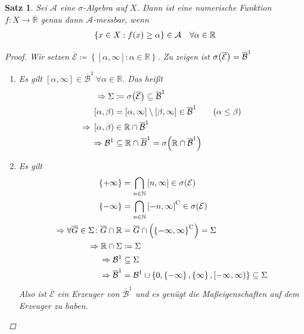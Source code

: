 \documentclass[11pt, twoside, a4paper]{article}
\theoremstyle{plain}
\newtheorem{satz}[blockelement]{Satz}
\numberwithin{equation}{subsection}
\newcommand{\set}[1]{\left\{#1\right\}}
\newcommand{\pair}[1]{\left(#1\right)}
\newcommand{\of}[1]{\mathopen{}\mathclose{}\bgroup\left(#1\aftergroup\egroup\right)}
\newcommand{\linterv}[1]{\left[#1\right)}
\newcommand{\interv}[1]{\left[#1\right]}
\newcommand{\impl}[0]{\Rightarrow{}}
\newcommand{\comp}[1]{{#1}^{\mathrm{C}}}
\newcommand{\R}{\mathbb{R}}
\newcommand{\N}{\mathbb{N}}
\newcommand{\mA}{\mathcal{A}}
\newcommand{\mB}{\mathcal{B}}
\newcommand{\mE}{\mathcal{E}}
\begin{document}
    \begin{satz}
        \label{satz:messbarkeit}
        Sei $\mA$ eine $\sigma$-Algebra auf $X$. Dann ist eine numerische Funktion $f: X\to\overline{\R}$ genau dann $\mA$-messbar, wenn
        \begin{align*}
            \set{x\in X: f\of{x} \geq \alpha} \in\mA\quad\forall \alpha\in\R
        \end{align*}
        \begin{proof}
            Wir setzen $\overline{\mE} \coloneqq \set{\interv{\alpha, \infty}: \alpha\in\R}$. Zu zeigen ist $\sigma\of{\overline{\mE}} = \overline{\mB}^1$
            \begin{enumerate}[label=(\arabic*)]
                \item Es gilt $\interv{\alpha, \infty} \in \overline{\mB}^1~\forall\alpha\in\R$. Das heißt
                \begin{align*}
                    \impl\Sigma &\coloneqq \sigma\of{\overline{\mE}} \subseteq \overline{\mB}^1\\
                    \linterv{\alpha, \beta} &= \interv{\alpha, \infty} \setminus \interv{\beta, \infty} \in\overline{\mB}^1\tag{$\alpha \leq \beta$}\\
                    \impl \linterv{\alpha, \beta} &\in \R\cap\overline{\mB}^1\\
                    \impl \mB^1 &\subseteq \R \cap \overline{B}^1 = \sigma\of{\R \cap \overline{\mB}^1}
                \end{align*}
                \item Es gilt
                \begin{align*}
                    \set{+\infty} &= \bigcap_{n\in\N} \interv{n, \infty} \in \sigma\of{\mE}\\
                    \set{-\infty} &= \bigcap_{n\in\N} \comp{\interv{-n, \infty}} \in \sigma\of{\mE}\\
                    \impl \forall \overline{G}\in\Sigma\colon \overline{G} \cap \R &= \overline{G} \cap \pair{\comp{\set{-\infty,\infty}}} = \Sigma\\
                    \impl \R \cap \Sigma &\coloneqq \Sigma\\
                    \impl \mB^1 &\subseteq \Sigma\\
                    \impl \overline{\mB}^1 &= \mB^1 \cup \set{0, \set{-\infty}, \set{\infty}, \linterv{-\infty, \infty}} \subseteq \Sigma
                \end{align*}
                Also ist $\overline{\mE}$ ein Erzeuger von $\overline{\mB}^1$ und es genügt die Maßeigenschaften auf dem Erzeuger zu haben.
            \end{enumerate}
        \end{proof}
    \end{satz}
\end{document}
